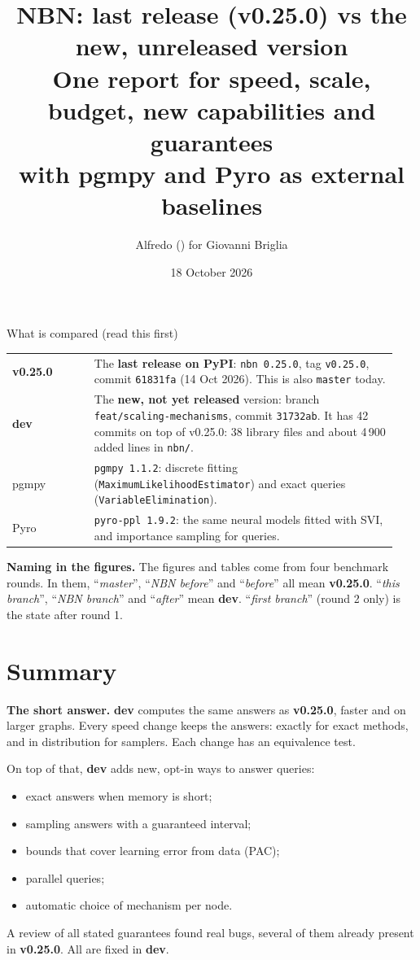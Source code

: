 \documentclass[10pt,a4paper]{article}
\title{\textbf{NBN: last release (v0.25.0) vs the new, unreleased version}\\[4pt]
\large One report for speed, scale, budget, new capabilities and guarantees\\
with pgmpy and Pyro as external baselines}
\author{Alfredo (\code{alfredo\_claude}) for Giovanni Briglia}
\date{18 October 2026}
\newcommand{\code}[1]{\texttt{#1}}
\newcommand{\old}{\textbf{v0.25.0}}
\newcommand{\new}{\textbf{dev}}
\begin{document}
\maketitle

\begin{keybox}{What is compared (read this first)}
\begin{tabular}{@{}p{0.2\linewidth}p{0.74\linewidth}@{}}
\old & The \textbf{last release on PyPI}: \code{nbn 0.25.0}, tag \code{v0.25.0}, commit \code{61831fa} (14 Oct 2026). This is also \code{master} today.\\
\new & The \textbf{new, not yet released} version: branch \code{feat/scaling-mechanisms}, commit \code{31732ab}. It has 42 commits on top of v0.25.0: 38 library files and about 4\,900 added lines in \code{nbn/}.\\
pgmpy & \code{pgmpy 1.1.2}: discrete fitting (\code{MaximumLikelihoodEstimator}) and exact queries (\code{VariableElimination}).\\
Pyro & \code{pyro-ppl 1.9.2}: the same neural models fitted with SVI, and importance sampling for queries.\\
\end{tabular}

\smallskip
\textbf{Naming in the figures.} The figures and tables come from four benchmark rounds. In them,
``\emph{master}'', ``\emph{NBN before}'' and ``\emph{before}'' all mean \old.
``\emph{this branch}'', ``\emph{NBN branch}'' and ``\emph{after}'' mean \new.
``\emph{first branch}'' (round 2 only) is the state after round 1.
\end{keybox}

\tableofcontents
\newpage

\section{Summary}

\textbf{The short answer.} \new{} computes the same answers as \old, faster and on larger
graphs. Every speed change keeps the answers: exactly for exact methods, and in distribution
for samplers. Each change has an equivalence test.

On top of that, \new{} adds new, opt-in ways to answer queries:
\begin{itemize}
\item exact answers when memory is short;
\item sampling answers with a guaranteed interval;
\item bounds that cover learning error from data (PAC);
\item parallel queries;
\item automatic choice of mechanism per node.
\end{itemize}
A review of all stated guarantees found real bugs, several of them already present in \old.
All are fixed in \new.
\end{document}
